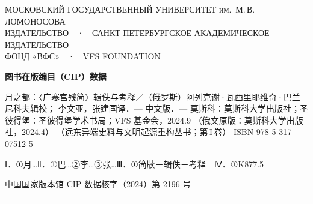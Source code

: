 \thispagestyle{empty}
\begingroup
\footnotesize
\linespread{1.22}\selectfont
\centering
\begin{minipage}[t][\dimexpr\textheight-24pt\relax][s]{\textwidth}
\centering

{\sffamily\scriptsize\color{pencil}
МОСКОВСКИЙ ГОСУДАРСТВЕННЫЙ УНИВЕРСИТЕТ им.\ М.\,В.\,ЛОМОНОСОВА\\
ИЗДАТЕЛЬСТВО\ \ ·\ \ САНКТ-ПЕТЕРБУРГСКОЕ АКАДЕМИЧЕСКОЕ ИЗДАТЕЛЬСТВО\\
ФОНД «ВФС»\ \ ·\ \ VFS FOUNDATION\par}

\vspace{3.2mm}
{\bfseries 图书在版编目（CIP）数据\par}
\vspace{2mm}

\begin{minipage}{0.94\textwidth}
\raggedright
月之都：〈广寒宫残简〉辑佚与考释／（俄罗斯）阿列克谢·瓦西里耶维奇·巴兰尼科夫辑校；
李文亚，张建国译．— 中文版．— 莫斯科：莫斯科大学出版社；圣彼得堡：圣彼得堡学术书局；VFS 基金会，2024.9
（俄文原版：莫斯科大学出版社，2024.4）
（远东异端史料与文明起源重构丛书；第\,I\,卷）
ISBN 978-5-317-07512-5

\vspace{1.4mm}
\hspace{2em}Ⅰ．①月…\quad Ⅱ．①巴…②李…③张…\quad Ⅲ．①简牍－辑佚－考释\ \ Ⅳ．①K877.5

\vspace{1.4mm}
\hspace{2em}中国国家版本馆 CIP 数据核字（2024）第 2196 号
\end{minipage}

\vspace{3.2mm}
{\color{rulegrey}\rule{0.94\textwidth}{0.3pt}}
\vspace{2.4mm}


\end{minipage}
